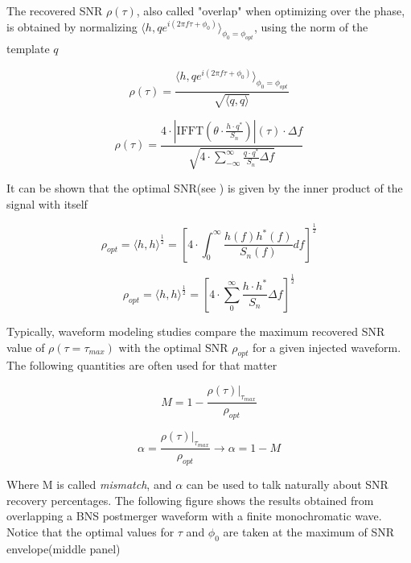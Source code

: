 The recovered SNR $\rho(\tau)$, also called "overlap" when optimizing over the phase, is obtained by normalizing $\langle h,q e^{i(2\pi f \tau + \phi_0)} \rangle_{\phi_0=\phi_{opt}}$, using the norm of the template $q$

\begin{equation}
\rho (\tau) = \frac{\langle h,q e^{i(2\pi f \tau + \phi_0)} \rangle_{\phi_0=\phi_{opt}}}{\sqrt{\langle q,q \rangle}}
\end{equation}


\begin{equation}\label{eq:17}
\rho (\tau)= 
\frac{
4\cdot \left| \mathrm{IFFT}\left(  \theta \cdot \frac{h \cdot q^{*} }{S_n}\right)\right| (\tau) \cdot \Delta f
}
{
\sqrt{4\cdot \sum_{-\infty}^{\infty} \frac{q\cdot q^*}{S_n} \Delta f}
}
\end{equation}

It can be shown that the optimal SNR(see \cite[chapter 5]{Sathyaprakash:2009xs}) is given by the inner product of the signal with itself

\begin{equation}
\rho_{opt} = \langle h,h \rangle^{\frac{1}{2}} = \left[4\cdot\int_{0}^{\infty} \frac{h(f)h^{*}(f)}{S_n(f)}df\right]^{\frac{1}{2}}
\end{equation}

\begin{equation}\label{sopt}
\rho_{opt} = \langle h,h \rangle^{\frac{1}{2}} = \left[4\cdot\sum_{0}^{\infty} \frac{ h\cdot h^{*}}{S_n}\Delta f\right]^{\frac{1}{2}}
\end{equation}

Typically, waveform modeling studies compare the maximum recovered SNR value of $\rho(\tau=\tau_{max})$ with the optimal SNR $\rho_{opt}$ for a given injected waveform. The following quantities are often used for that matter 


\begin{equation}
M = 1-\frac{\rho(\tau)|_{\tau_{max}}}{\rho_{opt}}
\end{equation}

\begin{equation}
\alpha = \frac{\rho(\tau)|_{\tau_{max}}}{\rho_{opt}} \rightarrow \alpha = 1-M
\end{equation}

Where M is called \textit{mismatch}, and $\alpha$ can be used to talk naturally about SNR recovery percentages. The following figure shows the results obtained from overlapping a BNS postmerger waveform with a finite monochromatic wave. Notice that  the optimal values for $\tau$ and $\phi_0$ are taken at the maximum of SNR envelope(middle panel)


